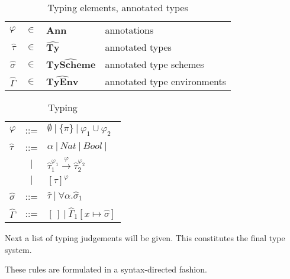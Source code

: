 \documentclass[a4paper]{article}
\begin{document}
\begin{table}
    \centering
    \begin{tabular}{rcll}
        $\varphi$ &               $\in$ & \textbf{Ann}                   & annotations \\ 
        $\widehat{\tau}$&         $\in$ & $\widehat{\textbf{Ty}      } $ & annotated types \\
        $\widehat{\sigma} $&      $\in$ & $\widehat{\textbf{TyScheme}} $ & annotated type schemes\\
        $\widehat{\Gamma}$&       $\in$ & $\widehat{\textbf{TyEnv}   } $ & annotated type environments  \\
    \end{tabular}
    \caption{Typing elements, annotated types}
    \label{tab:typingelems}
\end{table}
\begin{table}
    \centering
    \begin{tabular}{lcl}
        $ \varphi$         & ::= & $ \emptyset \:|\: \{\pi\} \:|\: \varphi_1 \cup \varphi_2 $ \\
        $\widehat{\tau}$   & ::= & $\alpha \:|\: Nat \: | \: Bool \: | \: $ \\
        & $|$ & $\widehat{\tau}_1^{\varphi_1}
                           \stackrel{\varphi}{\rightarrow} 
                           \widehat{\tau}_2^{\varphi_2} $ \\
                           & $|$ & $ %
                           [\widehat{\tau}]^\varphi   $ \\ 
        $\widehat{\sigma}$ & ::= & $\widehat{\tau} \:|\: \forall \alpha. \widehat{\sigma}_1 $ \\ 
        $\widehat{\Gamma}$ & ::= & $[\,] \:|\: \widehat{\Gamma}_1[x \mapsto \widehat{\sigma}] $ \\
    \end{tabular}
    \caption{Typing}
    \label{tab:typing}
\end{table}

Next a list of typing judgements will be given. This constitutes the final type
system. %

These rules are formulated in a syntax-directed fashion. 
\end{document}
